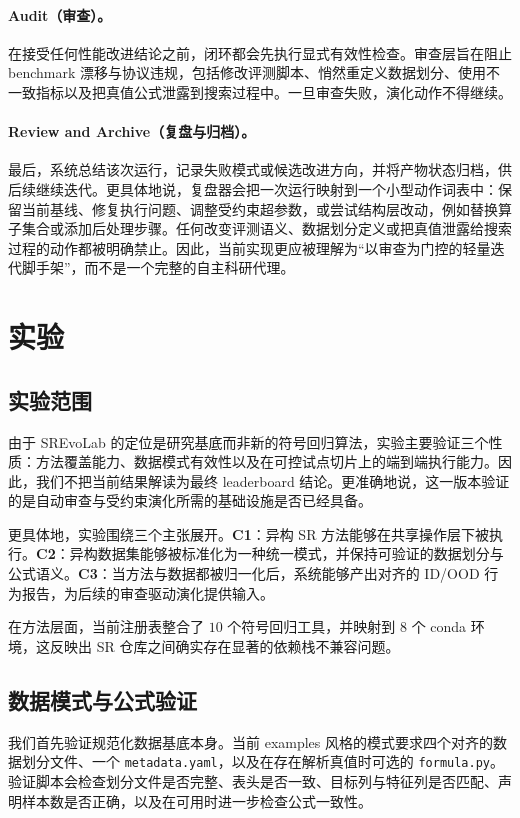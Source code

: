 \documentclass[UTF8]{ctexart}
\begin{document}
\paragraph{Audit（审查）。}
在接受任何性能改进结论之前，闭环都会先执行显式有效性检查。审查层旨在阻止 benchmark 漂移与协议违规，包括修改评测脚本、悄然重定义数据划分、使用不一致指标以及把真值公式泄露到搜索过程中。一旦审查失败，演化动作不得继续。

\paragraph{Review and Archive（复盘与归档）。}
最后，系统总结该次运行，记录失败模式或候选改进方向，并将产物状态归档，供后续继续迭代。更具体地说，复盘器会把一次运行映射到一个小型动作词表中：保留当前基线、修复执行问题、调整受约束超参数，或尝试结构层改动，例如替换算子集合或添加后处理步骤。任何改变评测语义、数据划分定义或把真值泄露给搜索过程的动作都被明确禁止。因此，当前实现更应被理解为“以审查为门控的轻量迭代脚手架”，而不是一个完整的自主科研代理。

\section{实验}

\subsection{实验范围}

由于 SREvoLab 的定位是研究基底而非新的符号回归算法，实验主要验证三个性质：方法覆盖能力、数据模式有效性以及在可控试点切片上的端到端执行能力。因此，我们不把当前结果解读为最终 leaderboard 结论。更准确地说，这一版本验证的是自动审查与受约束演化所需的基础设施是否已经具备。

更具体地，实验围绕三个主张展开。\textbf{C1}：异构 SR 方法能够在共享操作层下被执行。\textbf{C2}：异构数据集能够被标准化为一种统一模式，并保持可验证的数据划分与公式语义。\textbf{C3}：当方法与数据都被归一化后，系统能够产出对齐的 ID/OOD 行为报告，为后续的审查驱动演化提供输入。

在方法层面，当前注册表整合了 $10$ 个符号回归工具，并映射到 $8$ 个 conda 环境，这反映出 SR 仓库之间确实存在显著的依赖栈不兼容问题。

\subsection{数据模式与公式验证}

我们首先验证规范化数据基底本身。当前 examples 风格的模式要求四个对齐的数据划分文件、一个 \texttt{metadata.yaml}，以及在存在解析真值时可选的 \texttt{formula.py}。验证脚本会检查划分文件是否完整、表头是否一致、目标列与特征列是否匹配、声明样本数是否正确，以及在可用时进一步检查公式一致性。
\end{document}
